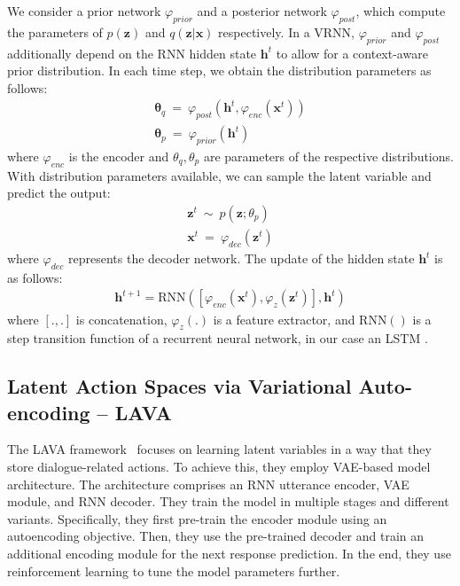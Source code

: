 We consider a prior network $\varphi_{prior}$ and a posterior network $\varphi_{post}$, which compute the parameters of $p(\mathbf{z})$ and $q(\mathbf{z}|\mathbf{x})$ respectively.
In a VRNN, $\varphi_{prior}$ and $\varphi_{post}$ additionally depend on the RNN hidden state $\mathbf{h}^t$ to allow for a context-aware prior distribution.
In each time step, we obtain the distribution parameters as follows:
\begin{equation}
\label{eq:distr_theta}
\begin{gathered}
    \mathbf{\theta}_{q}~=~\varphi_{post}(\mathbf{h}^t, \varphi_{enc}(\mathbf{x}^t))\\
    \mathbf{\theta}_{p}~=~\varphi_{prior}(\mathbf{h}^t)
\end{gathered}
\end{equation}
where $\varphi_{enc}$ is the encoder and $\theta_q, \theta_p$ are parameters of the respective distributions.
With distribution parameters available, we can sample the latent variable and predict the output:
\begin{equation}
\label{eq:x_infer}
\begin{gathered}
    \mathbf{z}^t~\mathtt{\sim}~p(\mathbf{z};\theta_{p})\\
    \mathbf{x}^t~=~ \varphi_{dec}(\mathbf{z}^t)
\end{gathered}
\end{equation}
where $\varphi_{dec}$ represents the decoder network.
The update of the hidden state $\mathbf{h}^t$ is as follows:
\begin{equation}
    \label{eq:hidden_update}
    \begin{gathered}
        \mathbf{h}^{t+1} = \text{RNN}([\varphi_{enc}(\mathbf{x}^t),\varphi_{z}(\mathbf{z}^t)], \mathbf{h}^t)
    \end{gathered}
\end{equation}
where $[.,.]$ is concatenation, $\varphi_z(.)$ is a feature extractor, and $\text{RNN}()$ is a step transition function of a recurrent neural network, in our case an LSTM \cite{hochreiter1997}.

\subsection{Latent Action Spaces via Variational Auto-encoding -- LAVA}
\label{02:sec:lava}
The LAVA framework~\cite{lubis-etal-2020-lava} focuses on learning latent variables in a way that they store dialogue-related actions.
To achieve this, they employ VAE-based model architecture.
The architecture comprises an RNN utterance encoder, VAE module, and RNN decoder.
They train the model in multiple stages and different variants.
Specifically, they first pre-train the encoder module using an autoencoding objective.
Then, they use the pre-trained decoder and train an additional encoding module for the next response prediction.
In the end, they use reinforcement learning to tune the model parameters further.

